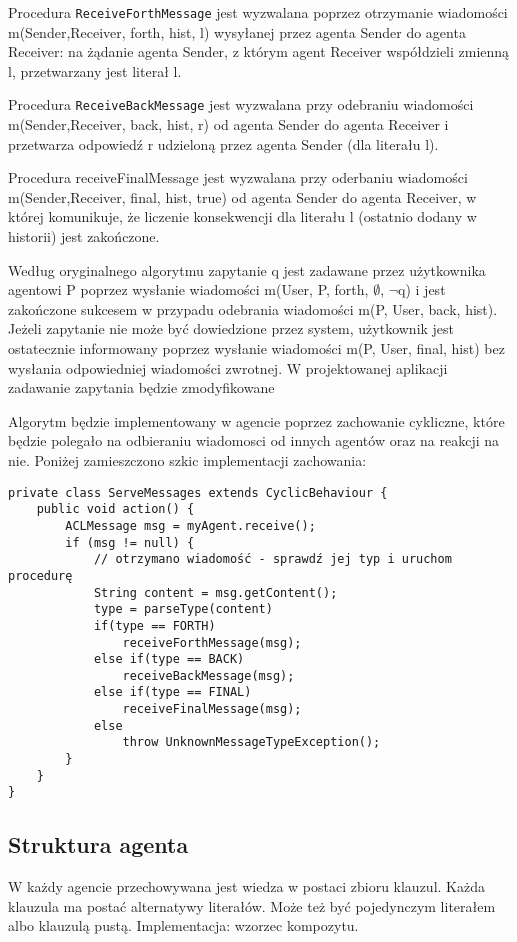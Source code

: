\documentclass[a4paper,12pt]{mwart}
\begin{document}
Procedura \verb!ReceiveForthMessage! jest wyzwalana poprzez otrzymanie wiadomości m(Sender,Receiver, forth, hist, l) wysyłanej przez agenta Sender do agenta Receiver: na żądanie agenta Sender, z którym agent Receiver współdzieli zmienną l, przetwarzany jest literał l.

Procedura \verb!ReceiveBackMessage! jest wyzwalana przy odebraniu wiadomości m(Sender,Receiver, back, hist, r) od agenta Sender do agenta Receiver i przetwarza odpowiedź r udzieloną przez agenta Sender (dla literału l).

Procedura receiveFinalMessage jest wyzwalana przy oderbaniu wiadomości m(Sender,Receiver, final, hist, true) od agenta Sender do agenta Receiver, w której komunikuje, że liczenie konsekwencji dla literału l (ostatnio dodany w historii) jest zakończone.

Według oryginalnego algorytmu zapytanie q jest zadawane przez użytkownika agentowi P poprzez wysłanie wiadomości m(User, P, forth, $\emptyset$, $\neg$q) i jest zakończone sukcesem w przypadu odebrania wiadomości m(P, User, back, hist). Jeżeli zapytanie nie może być dowiedzione przez system, użytkownik jest ostatecznie informowany poprzez wysłanie wiadomości m(P, User, final, hist) bez wysłania odpowiedniej wiadomości zwrotnej. W projektowanej aplikacji zadawanie zapytania będzie zmodyfikowane

Algorytm będzie implementowany w agencie poprzez zachowanie cykliczne, które będzie polegało na odbieraniu wiadomosci od innych agentów oraz na reakcji na nie. Poniżej zamieszczono szkic implementacji zachowania:
\begin{verbatim}
private class ServeMessages extends CyclicBehaviour {
    public void action() {
        ACLMessage msg = myAgent.receive();
        if (msg != null) {
            // otrzymano wiadomość - sprawdź jej typ i uruchom procedurę
            String content = msg.getContent();
            type = parseType(content)
            if(type == FORTH)
                receiveForthMessage(msg);
            else if(type == BACK)
                receiveBackMessage(msg);
            else if(type == FINAL)
                receiveFinalMessage(msg);
            else
                throw UnknownMessageTypeException();
        }
    }
}
\end{verbatim}
\subsection{Struktura agenta}
W każdy agencie przechowywana jest wiedza w postaci zbioru klauzul.
Każda klauzula ma postać alternatywy literałów. Może też być pojedynczym literałem albo klauzulą pustą.
Implementacja: wzorzec kompozytu.
\end{document}
